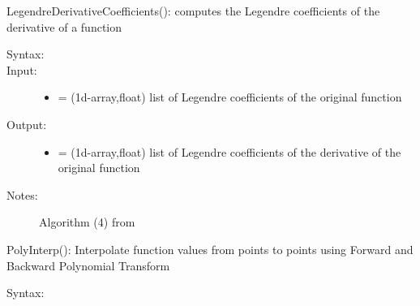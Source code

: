 \documentclass[letterpaper,10pt,english]{sphinxmanual}
\begin{document}
\begin{fulllineitems}
\begin{fulllineitems}
\end{fulllineitems}


\begin{fulllineitems}
\label{index:SpectralToolbox.Spectral1D.Poly1D.LegendreDerivativeCoefficients}
LegendreDerivativeCoefficients(): computes the Legendre coefficients of the derivative of a function
\begin{description}
\item[{Syntax:}] \leavevmode
{}

\item[{Input:}] \leavevmode\begin{itemize}
\item {} 
 = (1d-array,float) list of Legendre coefficients of the original function

\end{itemize}

\item[{Output:}] \leavevmode\begin{itemize}
\item {} 
 = (1d-array,float) list of Legendre coefficients of the derivative of the original function

\end{itemize}

\item[{Notes:}] \leavevmode
Algorithm (4) from \footnotemark[1]

\end{description}

\end{fulllineitems}


\begin{fulllineitems}
\label{index:SpectralToolbox.Spectral1D.Poly1D.PolyInterp}
PolyInterp(): Interpolate function values  from points  to points  using Forward and Backward Polynomial Transform
\begin{description}
\item[{Syntax:}] \leavevmode
{}


\end{description}
\end{fulllineitems}
\end{fulllineitems}
\end{document}
